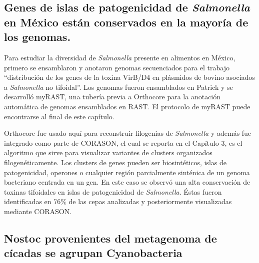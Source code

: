 \documentclass[12pt,twoside]{reedthesis}
\begin{document}
  \subsection{\texorpdfstring{Genes de islas de patogenicidad de
  \emph{Salmonella} en México están conservados en la mayoría de los
  genomas.}{Genes de islas de patogenicidad de Salmonella en México están conservados en la mayoría de los genomas.}}\label{genes-de-islas-de-patogenicidad-de-salmonella-en-mexico-estan-conservados-en-la-mayoria-de-los-genomas.}
  
  Para estudiar la diversidad de \emph{Salmonella} presente en alimentos
  en México, primero se ensamblaron y anotaron genomas secuenciados para
  el trabajo ``distribución de los genes de la toxina VirB/D4 en plásmidos
  de bovino asociados a \emph{Salmonella} no tifoidal''. Los genomas
  fueron ensamblados en Patrick y se desarrolló myRAST, una tubería previa
  a Orthocore para la anotación automática de genomas ensamblados en RAST.
  El protocolo de myRAST puede encontrarse al final de este capítulo.
  
  Orthocore fue usado aquí para reconstruir filogenias de
  \emph{Salmonella} y además fue integrado como parte de CORASON, el cual
  se reporta en el Capítulo 3, es el algoritmo que sirve para visualizar
  variantes de clusters organizados filogenéticamente. Los clusters de
  genes pueden ser biosintéticos, islas de patogenicidad, operones o
  cualquier región parcialmente sinténica de un genoma bacteriano centrada
  en un gen. En este caso se observó una alta conservación de toxinas
  tifoidales en islas de patogenicidad de \emph{Salmonella}. Éstas fueron
  identificadas en 76\% de las cepas analizadas y posteriormente
  visualizadas mediante CORASON.
  
  \subsection{Nostoc provenientes del metagenoma de cícadas se agrupan
  Cyanobacteria}\label{nostoc-provenientes-del-metagenoma-de-cicadas-se-agrupan-cyanobacteria}
  
\end{document}
